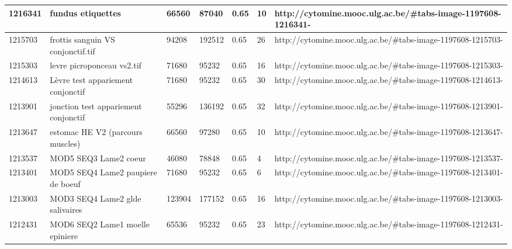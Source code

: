 \documentclass[a4paper,11pt]{report}
\numberwithin{figure}{section} %
\begin{document}
\begin{table}[]
{\begin{tabular}{|l|l|l|l|l|l|l|}
1216341  & fundus etiquettes                                                                            & 66560  & 87040  & 0.65                  & 10          & http://cytomine.mooc.ulg.ac.be/\#tabs-image-1197608-1216341-  \\ \hline
1215703  & frottis sanguin VS conjonctif.tif                                                            & 94208  & 192512 & 0.65                  & 26          & http://cytomine.mooc.ulg.ac.be/\#tabs-image-1197608-1215703-  \\ \hline
1215303  & levre picroponceau vs2.tif                                                                   & 71680  & 95232  & 0.65                  & 16          & http://cytomine.mooc.ulg.ac.be/\#tabs-image-1197608-1215303-  \\ \hline
1214613  & L\`{e}vre test appariement  conjonctif                                                           & 71680  & 95232  & 0.65                  & 30          & http://cytomine.mooc.ulg.ac.be/\#tabs-image-1197608-1214613-  \\ \hline
1213901  & jonction test appariement conjonctif                                                         & 55296  & 136192 & 0.65                  & 32          & http://cytomine.mooc.ulg.ac.be/\#tabs-image-1197608-1213901-  \\ \hline
1213647  & estomac HE V2 (parcours muscles)                                                             & 66560  & 97280  & 0.65                  & 10          & http://cytomine.mooc.ulg.ac.be/\#tabs-image-1197608-1213647-  \\ \hline
1213537  & MOD5 SEQ3 Lame2 coeur                                                                        & 46080  & 78848  & 0.65                  & 4           & http://cytomine.mooc.ulg.ac.be/\#tabs-image-1197608-1213537-  \\ \hline
1213401  & MOD5 SEQ4 Lame2 paupiere de boeuf                                                            & 71680  & 95232  & 0.65                  & 6           & http://cytomine.mooc.ulg.ac.be/\#tabs-image-1197608-1213401-  \\ \hline
1213003  & MOD3 SEQ4 Lame2 glde salivaires                                                              & 123904 & 177152 & 0.65                  & 16          & http://cytomine.mooc.ulg.ac.be/\#tabs-image-1197608-1213003-  \\ \hline
1212431  & MOD6 SEQ2 Lame1 moelle epiniere                                                              & 65536  & 95232  & 0.65                  & 23          & http://cytomine.mooc.ulg.ac.be/\#tabs-image-1197608-1212431-  \\ \hline

\end{tabular}}
\end{table}
\end{document}
